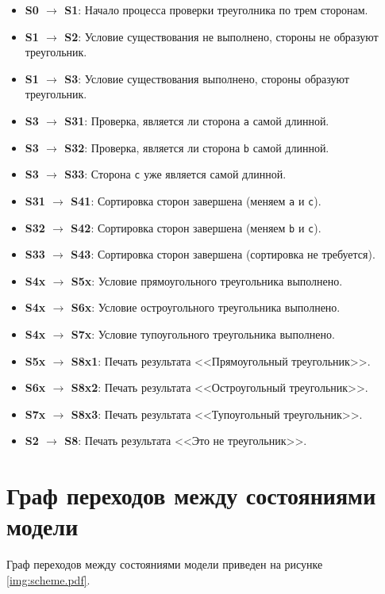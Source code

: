 \documentclass{bmstu}
\begin{document}
\begin{itemize}
  \item \textbf{S0 $\rightarrow$ S1}: Начало процесса проверки треуголника по трем сторонам.
  \item \textbf{S1 $\rightarrow$ S2}: Условие существования не выполнено, стороны не образуют треугольник.
  \item \textbf{S1 $\rightarrow$ S3}: Условие существования выполнено, стороны образуют треугольник.
  \item \textbf{S3 $\rightarrow$ S31}: Проверка, является ли сторона \texttt{a} самой длинной.
  \item \textbf{S3 $\rightarrow$ S32}: Проверка, является ли сторона \texttt{b} самой длинной.
  \item \textbf{S3 $\rightarrow$ S33}: Сторона \texttt{c} уже является самой длинной.
  \item \textbf{S31 $\rightarrow$ S41}: Сортировка сторон завершена (меняем \texttt{a} и \texttt{c}).
  \item \textbf{S32 $\rightarrow$ S42}: Сортировка сторон завершена (меняем \texttt{b} и \texttt{c}).
  \item \textbf{S33 $\rightarrow$ S43}: Сортировка сторон завершена (сортировка не требуется).
  \item \textbf{S4x $\rightarrow$ S5x}: Условие прямоугольного треугольника выполнено.
  \item \textbf{S4x $\rightarrow$ S6x}: Условие остроугольного треугольника выполнено.
  \item \textbf{S4x $\rightarrow$ S7x}: Условие тупоугольного треугольника выполнено.
  \item \textbf{S5x $\rightarrow$ S8x1}: Печать результата <<Прямоугольный треугольник>>.
  \item \textbf{S6x $\rightarrow$ S8x2}: Печать результата <<Остроугольный треугольник>>.
  \item \textbf{S7x $\rightarrow$ S8x3}: Печать результата <<Тупоугольный треугольник>>.
  \item \textbf{S2 $\rightarrow$ S8}: Печать результата <<Это не треугольник>>.
\end{itemize}

\clearpage
\section{Граф переходов между состояниями модели}

Граф переходов между состояниями модели приведен на рисунке \ref{img:scheme.pdf}.
\end{document}

